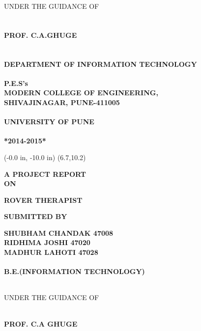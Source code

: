 \documentclass[12pt,a4paper]{article}
\begin{document}
	 \vspace{0.2 in}
	\begin{center}
	    UNDER THE GUIDANCE OF \\
	    \\
	    \\
	    \textbf{PROF. C.A.GHUGE}\\
	    \\
	    \\
	    \textbf{DEPARTMENT OF INFORMATION TECHNOLOGY}\\
	    \\
	    \textbf{P.E.S's}\\
	    \textbf{MODERN COLLEGE OF ENGINEERING,}\\
	    \textbf{SHIVAJINAGAR, PUNE-411005}\\
	    \\
	    \textbf{UNIVERSITY OF PUNE}\\
	    \\
	    \textbf{*2014-2015*}\\
	     \end{center}

\newpage
\pagestyle{empty}
	\thisfancyput(-0.0 in, -10.0 in) {\setlength{\unitlength}{1 in}\framebox(6.7,10.2)}
\begin{center}
      
      \textbf{A PROJECT REPORT}\\
      \vspace{0.2 in}
      \textbf{ON}
      \vspace{0.2 in}
       
			\end{center}
\vspace{0.1 in}
	\begin{center}
		\textbf{ROVER THERAPIST}\\
	\end{center}
     
	\vspace{0.2 in}
	
	\begin{center}
	   \textbf{SUBMITTED BY}
	\end{center}
	\vspace{0.1 in}
	\begin{center}
	\textbf{SHUBHAM CHANDAK  47008}\\
	\textbf{RIDHIMA JOSHI  47020}\\	
	\textbf{MADHUR LAHOTI  47028}\\
	\\
	\textbf{B.E.(INFORMATION TECHNOLOGY)}\\
	\\
	\begin{center}
	UNDER THE GUIDANCE OF\\
	\\
	\end{center}
	\textbf{PROF. C.A GHUGE}\\
	\\
	\end{center}
	
\end{document}
